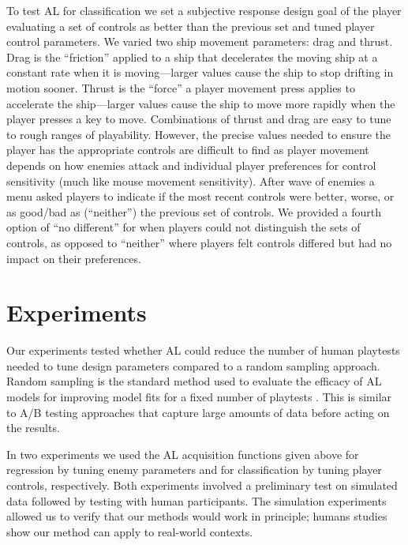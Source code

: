 \documentclass{sig-alternate}
\begin{document}
To test AL for classification we set a subjective response design goal of the player evaluating a set of controls as better than the previous set and tuned player control parameters.
We varied two ship movement parameters: drag and thrust. 
Drag is the ``friction'' applied to a ship that decelerates the moving ship at a constant rate when it is moving---larger values cause the ship to stop drifting in motion sooner. 
Thrust is the ``force'' a player movement press applies to accelerate the ship---larger values cause the ship to move more rapidly when the player presses a key to move. 
%
Combinations of thrust and drag are easy to tune to rough ranges of playability.
However, the precise values needed to ensure the player has the appropriate controls are difficult to find as player movement depends on how enemies attack and individual player preferences for control sensitivity (much like mouse movement sensitivity). 
After wave of enemies a menu asked players to indicate if the most recent controls were better, worse, or as good/bad as (``neither'') the previous set of controls.
We provided a fourth option of ``no different'' for when players could not distinguish the sets of controls, as opposed to ``neither'' where players felt controls differed but had no impact on their preferences.





\section{Experiments}
Our experiments tested whether AL could reduce the number of human playtests needed to tune design parameters compared to a random sampling approach.
Random sampling is the standard method used to evaluate the efficacy of AL models for improving model fits for a fixed number of playtests \cite{settles2012:al-book}. 
This is similar to A/B testing approaches that capture large amounts of data before acting on the results.

In two experiments we used the AL acquisition functions given above for regression by tuning enemy parameters and for classification by tuning player controls, respectively.
Both experiments involved a preliminary test on simulated data followed by testing with human participants.
The simulation experiments allowed us to verify that our methods would work in principle; humans studies show our method can apply to real-world contexts.
\end{document}
